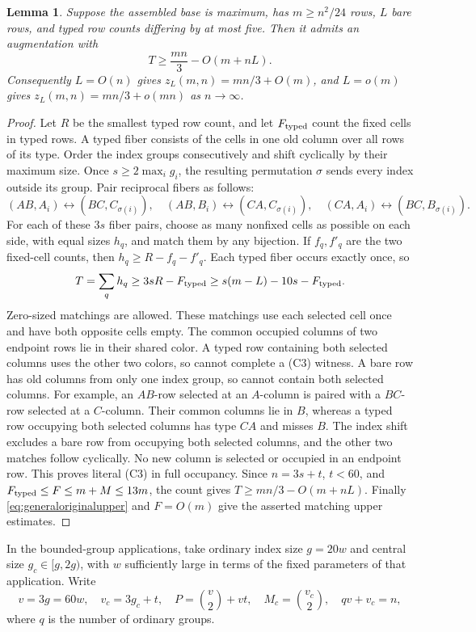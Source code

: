\documentclass[11pt]{article}
\newtheorem{lemma}[theorem]{Lemma}
\newcommand{\zl}{z_L}
\begin{document}
\begin{lemma}\label{lem:frameaugmentation}
Suppose the assembled base is maximum, has $m\ge n^2/24$ rows,
$L$ bare rows, and typed row counts differing by at most five.
Then it admits an augmentation with
\[
 T\ge\frac{mn}{3}-O(m+nL).
\]
Consequently $L=O(n)$ gives $\zl(m,n)=mn/3+O(m)$, and
$L=o(m)$ gives $\zl(m,n)=mn/3+o(mn)$ as $n\to\infty$.
\end{lemma}
\begin{proof}
Let $R$ be the smallest typed row count, and let $F_{\rm typed}$ count
the fixed cells in typed rows. A typed fiber consists of the cells in
one old column over all rows of its type.
Order the index groups consecutively and shift cyclically by their
maximum size. Once $s\ge2\max_i g_i$, the resulting permutation
$\sigma$ sends every index outside its group.
Pair reciprocal fibers as follows:
\[
 (AB,A_i)\leftrightarrow(BC,C_{\sigma(i)}),\quad
 (AB,B_i)\leftrightarrow(CA,C_{\sigma(i)}),\quad
 (CA,A_i)\leftrightarrow(BC,B_{\sigma(i)}).
\]
For each of these $3s$ fiber pairs, choose as many nonfixed cells as
possible on each side, with equal sizes $h_q$, and match them by any
bijection. If $f_q,f'_q$ are the two fixed-cell counts, then
$h_q\ge R-f_q-f'_q$. Each typed fiber occurs exactly once, so
\[
 T=\sum_q h_q\ge3sR-F_{\rm typed}
    \ge s(m-L)-10s-F_{\rm typed}.
\]
Zero-sized matchings are allowed. These matchings use each selected cell once and have both opposite cells
empty. The common occupied columns of two endpoint rows lie in their
shared color. A typed row containing both selected columns uses the other
two colors, so cannot complete a (C3) witness. A bare row has old columns
from only one index group, so cannot contain both selected columns.
For example, an $AB$-row selected at an $A$-column is paired with a
$BC$-row selected at a $C$-column. Their common columns lie in $B$,
whereas a typed row occupying both selected columns has type $CA$ and
misses $B$. The index shift excludes a bare row from occupying both
selected columns, and the other two matches follow cyclically.
No new column is selected or occupied in an endpoint row. This proves
literal (C3) in full occupancy.
Since $n=3s+t$, $t<60$, and $F_{\rm typed}\le F\le m+M\le13m$,
the count gives $T\ge mn/3-O(m+nL)$.
Finally \eqref{eq:generaloriginalupper} and $F=O(m)$ give the
asserted matching upper estimates.
\end{proof}

In the bounded-group applications, take ordinary index size $g=20w$
and central size $g_c\in[g,2g)$, with $w$ sufficiently large in terms
of the fixed parameters of that application. Write
\[
 v=3g=60w,\quad v_c=3g_c+t,\quad
 P=\binom v2+vt,\quad M_c=\binom{v_c}{2},\quad qv+v_c=n,
\]
where $q$ is the number of ordinary groups.
\end{document}
